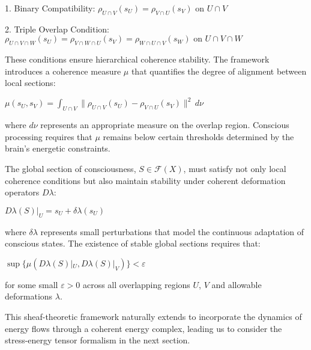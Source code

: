 \begin{refsection}
1. Binary Compatibility:
$\rho_{U \cap V}(s_U) = \rho_{V \cap U}(s_V) \text{ on } U \cap V$

2. Triple Overlap Condition:
$\rho_{U \cap V \cap W}(s_U) = \rho_{V \cap W \cap U}(s_V) = \rho_{W \cap U \cap V}(s_W) \text{ on } U \cap V \cap W$

These conditions ensure hierarchical coherence stability. The framework introduces a coherence measure $\mu$ that quantifies the degree of alignment between local sections:

$\mu(s_U, s_V) = \int_{U \cap V} \|\rho_{U \cap V}(s_U) - \rho_{V \cap U}(s_V)\|^2 \,d\nu$

where $d\nu$ represents an appropriate measure on the overlap region. Conscious processing requires that $\mu$ remains below certain thresholds determined by the brain's energetic constraints.

The global section of consciousness, $S \in \mathcal{F}(X)$, must satisfy not only local coherence conditions but also maintain stability under coherent deformation operators $D\lambda$:

$D\lambda(S)|_U = s_U + \delta\lambda(s_U)$

where $\delta\lambda$ represents small perturbations that model the continuous adaptation of conscious states. The existence of stable global sections requires that:

$\sup\{\mu(D\lambda(S)|_U, D\lambda(S)|_V)\} < \varepsilon$

for some small $\varepsilon > 0$ across all overlapping regions $U$, $V$ and allowable deformations $\lambda$.

This sheaf-theoretic framework naturally extends to incorporate the dynamics of energy flows through a coherent energy complex, leading us to consider the stress-energy tensor formalism in the next section.


\end{refsection}
